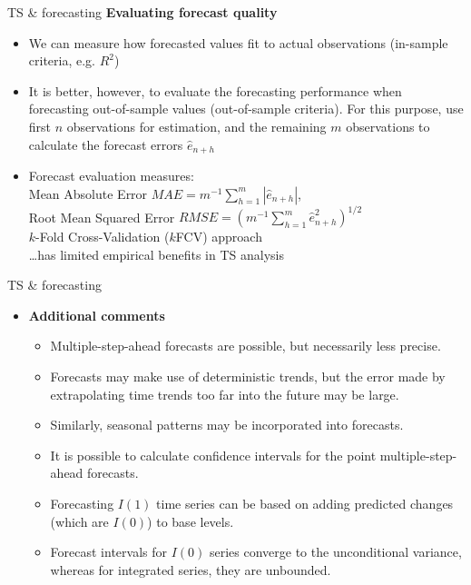 \documentclass{beamer}
\begin{document}
\begin{frame}{TS \& forecasting}
\textbf{Evaluating forecast quality}
\begin{itemize}
\item We can measure how forecasted values fit to actual observations (in-sample criteria, e.g. $R^2$)
\vspace{0.2cm}
\item It is better, however, to evaluate the forecasting performance when forecasting out-of-sample values (out-of-sample criteria). For this purpose, use first $n$ observations for estimation, and the  remaining $m$ observations to calculate the forecast errors $\hat{e}_{n+h}$
\vspace{0.2cm}
\item Forecast evaluation measures: \\
\vspace{0.2cm}
Mean Absolute Error $\textit{MAE} = m^{-1}\sum_{h=1}^{m}|\hat{e}_{n+h}|$, \\
\vspace{0.2cm}
Root Mean Squared Error $\textit{RMSE} = (m^{-1}\sum_{h=1}^{m}\hat{e}_{n+h}^2)^{1/2}$\\
\vspace{0.2 cm}
$k$-Fold Cross-Validation ($k$FCV) approach\\ \dots has limited empirical benefits in TS analysis
\end{itemize}
\end{frame}
\begin{frame}{TS \& forecasting}
\begin{itemize}
\item \textbf{Additional comments}
\begin{itemize}
\item Multiple-step-ahead forecasts are possible, but necessarily less precise.
\item Forecasts may make use of deterministic trends, but the error made  by extrapolating time trends too far into the future may be large.
\item Similarly, seasonal patterns may be incorporated into forecasts.
\item It is possible to calculate confidence intervals for the point multiple-step-ahead forecasts.  
\item Forecasting $I(1)$ time series can be based on adding predicted changes (which are $I(0)$) to base levels. 
\item Forecast intervals for $I(0)$ series converge to the unconditional variance, whereas for integrated series, they are unbounded.
\end{itemize}
\end{itemize}
\end{frame}
\end{document}
